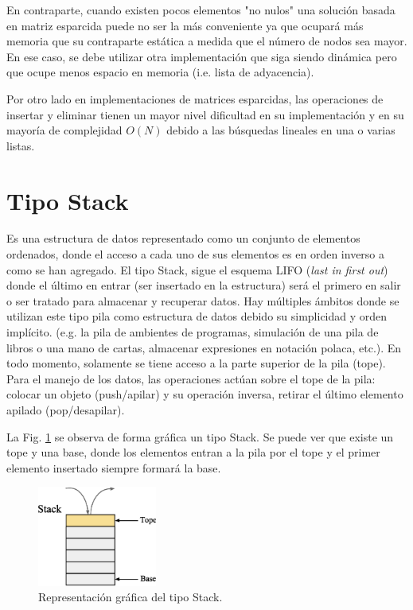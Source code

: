 En contraparte, cuando existen pocos elementos "no nulos" una solución basada en matriz esparcida puede no ser la más conveniente ya que ocupará más memoria que su contraparte estática a medida que el número de nodos sea mayor. En ese caso, se debe utilizar otra implementación que siga siendo dinámica pero que ocupe menos espacio en memoria (i.e. lista de adyacencia).

Por otro lado en implementaciones de matrices esparcidas, las operaciones de insertar y eliminar tienen un mayor nivel dificultad en su implementación y en su mayoría de complejidad $O(N)$ debido a las búsquedas lineales en una o varias listas.

\section{Tipo Stack}

Es una estructura de datos representado como un conjunto de elementos ordenados, donde el acceso a cada uno de sus elementos es en orden inverso a como se han agregado. El tipo Stack, sigue el esquema LIFO (\textit{last in first out}) donde el último en entrar (ser insertado en la estructura) será el primero en salir o ser tratado para almacenar y recuperar datos. Hay múltiples ámbitos donde se utilizan este tipo pila como estructura de datos debido su simplicidad y orden implícito. (e.g. la pila de ambientes de programas, simulación de una pila de libros o una mano de cartas, almacenar expresiones en notación polaca, etc.). En todo momento, solamente se tiene acceso a la parte superior de la pila (tope).  Para el manejo de los datos, las operaciones actúan sobre el tope de la pila: colocar un objeto (push/apilar) y su operación inversa, retirar el último elemento apilado (pop/desapilar).

La Fig. \ref{fig:stack1} se observa de forma gráfica un tipo Stack. Se puede ver que existe un tope y una base, donde los elementos entran a la pila por el tope y el primer elemento insertado siempre formará la base.

\begin{figure}[htp!]
  \begin{center}
    \includegraphics[width=0.35\textwidth]{images/stack.eps}
  \end{center}
  \caption{Representación gráfica del tipo Stack.}
  \label{fig:stack1}
\end{figure}

